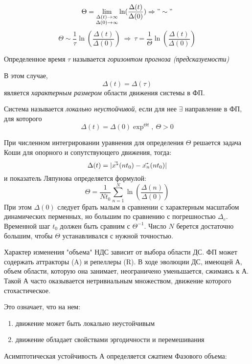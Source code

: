 \begin{equation}
  \Theta = \lim_{\substack{\Delta(t)\rightarrow\infty \\ \Delta(0)\rightarrow\infty}} \ln(\frac{\Delta(t)}{\Delta(0)}) \Rightarrow "\sim"
\end{equation}
\begin{equation}
  \Theta \sim \frac{1}{\tau}\ln(\frac{\Delta(t)}{\Delta(0)})\ \Rightarrow\ \tau = \frac{1}{\Theta}\ln(\frac{\Delta(t)}{\Delta(0)})
\end{equation}

Определенное время $\tau$ называется \textit{горизонтом прогноза (предсказуемости)}

В этом случае, $$\Delta(t) = \Delta(\tau)$$ является \textit{характерным размером} области движения системы в ФП.

\begin{remark}
	Система называется \textit{локально неустойчивой}, если для нее $\exists$ направление в ФП, для которого $$\Delta(t) = \Delta(0)\exp^{\Theta t}, \ \Theta>0$$
\end{remark}

\begin{remark}
  При численном интегрировании уравнения для определения $\Theta$ решается задача Коши для опорного и сопутствующего движения, тогда:
  $$\Delta(t)= \lvert\vec{x^{*}}(nt_0) - \vec{x_{n}}(nt_0)\rvert$$ и показатель Ляпунова определяется формулой:
  $$\Theta = \frac{1}{Nt_0}\sum_{n=1}^{N}\ln(\frac{\Delta(n)}{\Delta(0)})$$
  При этом $\Delta(0)$ следует брать малым в сравнении с характерным масштабом динамических перменных, но большим по сравнению с погрешностью $\Delta_{c}$.
  Временной шаг $t_{0}$ должен быть сравним с $\Theta^{-1}$.
  Число $N$ берется достаточно большим, чтобы $\Theta$ устанавливался с нужной точностью.
\end{remark}

Характер изменения "объема" НДС зависит от выбора области ДС. ФП может содержать аттракторы (A) и репеллеры (R). В ходе эволюции ДС, имеющей А, объем области, которую она занимает, неограничено уменьшается, сжимаясь к А. Такой А часто оказывается нетривиальным множеством, движение которого стохастическое.

Это означает, что на нем:
\begin{enumerate}
  \item движение может быть локально неустойчивым
  \item движение обладает свойствами эргодичности и перемешивания
\end{enumerate}

Асимптотическая устойчивость А определяется сжатием Фазового объема:
